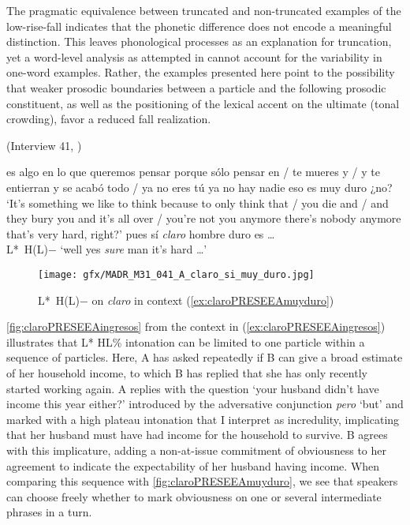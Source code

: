 The pragmatic equivalence between truncated and non-truncated examples of the low-rise-fall indicates that the phonetic difference does not encode a meaningful distinction. This leaves phonological processes as an explanation for truncation, yet a word-level analysis as attempted in \citet{TorreiraGrice.2018} cannot account for the variability in one-word examples. Rather, the examples presented here point to the possibility that weaker prosodic boundaries between a particle and the following prosodic constituent, as well as the positioning of the lexical accent on the ultimate (tonal crowding), favor a reduced fall realization.

\begin{exe}
	\ex \label{ex:claroPRESEEAmuyduro} (Interview 41, \cite{PRESEEA.20142020})
	\begin{xlist}[A:]
	 es algo en lo que queremos pensar porque sólo pensar en / te mueres y / y te entierran y se acabó todo / ya no eres tú ya no hay nadie eso es muy duro ¿no? 
	\glt `It's something we like to think because to only think that / you die and / and they bury you and it's all over / you're not you anymore there's nobody anymore that's very hard, right?'
	 pues sí \textit{claro} hombre duro es \ldots \\
	\hspace*{3.5em}L*~H(L)$-$
	\glt `well yes \textit{sure} man it's hard \ldots'
	\end{xlist}
\end{exe}

\begin{figure}
	\texttt{[image: gfx/MADR\_M31\_041\_A\_claro\_si\_muy\_duro.jpg]}
	\caption{L*~H(L)$-$ on \textit{claro} in context (\ref{ex:claroPRESEEAmuyduro}) \href{https://osf.io/5paqg/}{\faVolumeUp} \label{fig:claroPRESEEAmuyduro}}
\end{figure}

\autoref{fig:claroPRESEEAingresos} from the context in (\ref{ex:claroPRESEEAingresos}) illustrates that L* HL\% intonation can be limited to one particle within a sequence of particles. Here, A has asked repeatedly if B can give a broad estimate of her household income, to which B has replied that she has only recently started working again. A replies with the question `your husband didn't have income this year either?' introduced by the adversative conjunction \textit{pero} `but' and marked with a high plateau intonation that I interpret as incredulity, implicating that her husband must have had income for the household to survive. B agrees with this implicature, adding a non-at-issue commitment of obviousness to her agreement to indicate the expectability of her husband having income. When comparing this sequence with \autoref{fig:claroPRESEEAmuyduro}, we see that speakers can choose freely whether to mark obviousness on one or several intermediate phrases in a turn.

